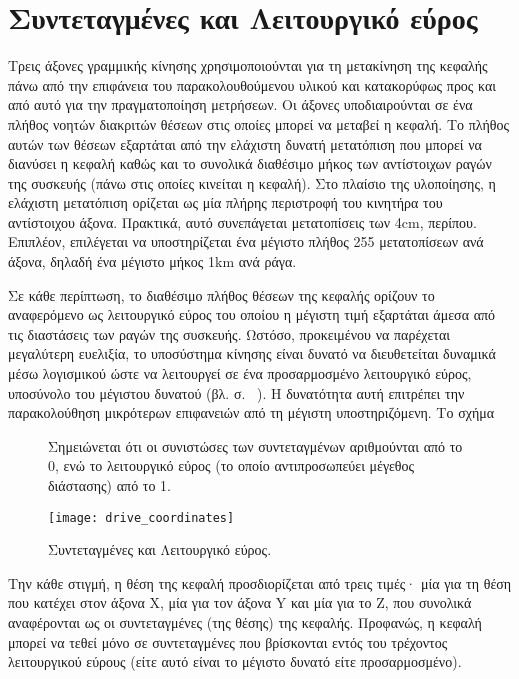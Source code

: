 %
%

\section{Συντεταγμένες και Λειτουργικό εύρος}
\label{sec:motor:coordinates}

Τρεις άξονες γραμμικής κίνησης χρησιμοποιούνται για τη μετακίνηση της κεφαλής
πάνω από την επιφάνεια του παρακολουθούμενου υλικού και κατακορύφως προς και από
αυτό για την πραγματοποίηση μετρήσεων.
Οι άξονες υποδιαιρούνται σε ένα πλήθος νοητών διακριτών θέσεων στις οποίες
μπορεί να μεταβεί η κεφαλή. Το πλήθος αυτών των θέσεων εξαρτάται από την
ελάχιστη δυνατή μετατόπιση που μπορεί να διανύσει η κεφαλή καθώς και το συνολικά
διαθέσιμο μήκος των αντίστοιχων ραγών της συσκευής (πάνω στις οποίες κινείται η
κεφαλή). Στο πλαίσιο της υλοποίησης, η ελάχιστη μετατόπιση ορίζεται ως μία
πλήρης περιστροφή του κινητήρα του αντίστοιχου άξονα. Πρακτικά, αυτό συνεπάγεται
μετατοπίσεις των 4cm, περίπου. Επιπλέον, επιλέγεται να υποστηρίζεται ένα μέγιστο
πλήθος 255 μετατοπίσεων ανά άξονα, δηλαδή ένα μέγιστο μήκος 1km ανά ράγα.

Σε κάθε περίπτωση, το διαθέσιμο πλήθος θέσεων της κεφαλής ορίζουν το αναφερόμενο
ως λειτουργικό εύρος του οποίου η μέγιστη τιμή εξαρτάται άμεσα από τις
διαστάσεις των ραγών της συσκευής. Ωστόσο, προκειμένου να παρέχεται
μεγαλύτερη ευελιξία, το υποσύστημα κίνησης είναι δυνατό να διευθετείται δυναμικά
μέσω λογισμικού ώστε να λειτουργεί σε ένα προσαρμοσμένο λειτουργικό εύρος,
υποσύνολο του μέγιστου δυνατού (βλ.  σ.~%
\pageref{subsec:network:config}).
Η δυνατότητα αυτή επιτρέπει την παρακολούθηση μικρότερων επιφανειών από τη
μέγιστη υποστηριζόμενη. Το σχήμα

\begin{figure}
    \caption{Συντεταγμένες και Λειτουργικό εύρος.\label{fig:motor:coordinates}}
    Σημειώνεται ότι οι συνιστώσες των  συντεταγμένων αριθμούνται από το 0, ενώ
    το λειτουργικό εύρος (το οποίο αντιπροσωπεύει μέγεθος διάστασης) από το 1.
    \begin{center}
    \texttt{[image: drive\_coordinates]}
    \end{center}
\end{figure}

Την κάθε στιγμή, η θέση της κεφαλή προσδιορίζεται από τρεις τιμές· μία για τη
θέση που κατέχει στον άξονα X, μία για τον άξονα Y και μία για το Z, που
συνολικά αναφέρονται ως οι συντεταγμένες (της θέσης) της κεφαλής. Προφανώς,
η κεφαλή μπορεί να τεθεί μόνο σε συντεταγμένες που βρίσκονται εντός του
τρέχοντος λειτουργικού εύρους (είτε αυτό είναι το μέγιστο δυνατό είτε
προσαρμοσμένο).


